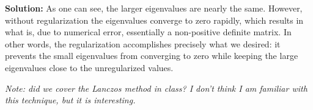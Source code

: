 \documentclass[11pt]{article}
\newenvironment{solution}{\begin{trivlist}\item[]{\bf Solution:}}
                      {\end{trivlist}}
\begin{document}
\begin{enumerate}
\begin{solution}
As one can see, the larger eigenvalues are nearly the same. However,
 without regularization the eigenvalues converge to zero rapidly, which
 results in what is, due to numerical error, essentially a non-positive
 definite matrix. In other words, the regularization accomplishes
 precisely what we desired: it prevents the small eigenvalues from
 converging to zero while keeping the large eigenvalues close to the
 unregularized values. 

\emph{Note: did we cover the Lanczos method in class? I don't think I am
 familiar with this technique, but it is interesting. }

\end{solution}


\end{enumerate}

%
\end{document}
